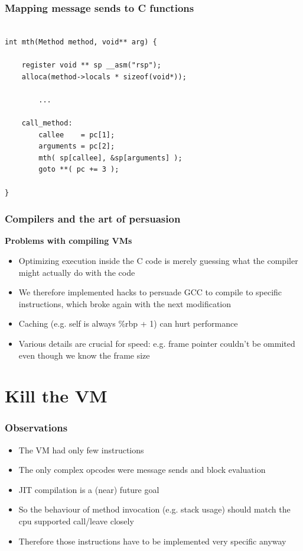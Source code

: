 \documentclass{beamer}
\begin{document}
\begin{frame}[fragile]
    \frametitle{Mapping message sends to C functions}
    \begin{lstlisting}

int mth(Method method, void** arg) {

    register void ** sp __asm("rsp");
    alloca(method->locals * sizeof(void*));

        ...

    call_method:
        callee    = pc[1];
        arguments = pc[2]; 
        mth( sp[callee], &sp[arguments] );
        goto **( pc += 3 );

}
    \end{lstlisting}
\end{frame}

\begin{frame}[fragile]
    \frametitle{Compilers and the art of persuasion}
    {\bf Problems with compiling VMs}
    \begin{itemize}
        \item Optimizing execution inside the C code is merely guessing what the compiler might 
                actually do with the code
        \item We therefore implemented hacks to persuade GCC to compile to specific instructions, which broke again with the next modification
        \item Caching (e.g. self is always \%rbp + 1) can hurt performance
        \item Various details are crucial for speed: 
                e.g. frame pointer couldn't be ommited even though we know the frame size
    \end{itemize}
\end{frame}

\section{Kill the VM}

\begin{frame}[fragile]
    \frametitle{Observations}
    \begin{itemize}
        \item The VM had only few instructions
        \item The only complex opcodes were message sends and block evaluation
        \item JIT compilation is a (near) future goal
        \item So the behaviour of method invocation (e.g. stack usage) should match the cpu supported call/leave closely
        \item Therefore those instructions have to be implemented very specific anyway
    \end{itemize}
\end{frame}
\end{document}
